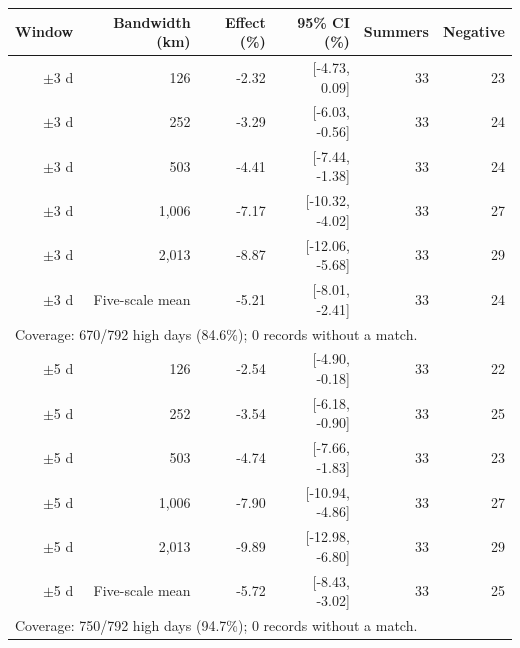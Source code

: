 \begin{tabular}{rrrrrr}
\toprule
Window & Bandwidth (km) & Effect (\%) & 95\% CI (\%) & Summers & Negative \\
\midrule
$\pm$3 d & 126 & -2.32 & [-4.73, 0.09] & 33 & 23 \\
$\pm$3 d & 252 & -3.29 & [-6.03, -0.56] & 33 & 24 \\
$\pm$3 d & 503 & -4.41 & [-7.44, -1.38] & 33 & 24 \\
$\pm$3 d & 1,006 & -7.17 & [-10.32, -4.02] & 33 & 27 \\
$\pm$3 d & 2,013 & -8.87 & [-12.06, -5.68] & 33 & 29 \\
$\pm$3 d & Five-scale mean & -5.21 & [-8.01, -2.41] & 33 & 24 \\
\multicolumn{6}{l}{\footnotesize Coverage: 670/792 high days (84.6\%); 0 records without a match.} \\
\addlinespace
$\pm$5 d & 126 & -2.54 & [-4.90, -0.18] & 33 & 22 \\
$\pm$5 d & 252 & -3.54 & [-6.18, -0.90] & 33 & 25 \\
$\pm$5 d & 503 & -4.74 & [-7.66, -1.83] & 33 & 23 \\
$\pm$5 d & 1,006 & -7.90 & [-10.94, -4.86] & 33 & 27 \\
$\pm$5 d & 2,013 & -9.89 & [-12.98, -6.80] & 33 & 29 \\
$\pm$5 d & Five-scale mean & -5.72 & [-8.43, -3.02] & 33 & 25 \\
\multicolumn{6}{l}{\footnotesize Coverage: 750/792 high days (94.7\%); 0 records without a match.} \\
\bottomrule
\end{tabular}
